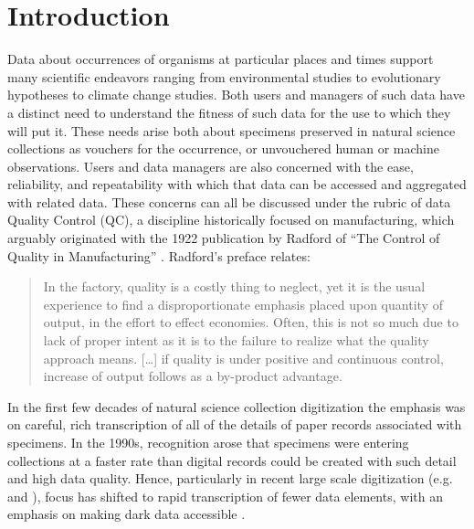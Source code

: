 \documentclass{article}
\begin{document}
\section{Introduction}
Data about occurrences of organisms at particular places and times support many scientific endeavors ranging from environmental studies to evolutionary hypotheses to climate change studies. 
Both users and managers of such data have a distinct need to understand the fitness of such data for the use to which they will put it. 
These needs arise both about specimens preserved in natural science collections as vouchers for the occurrence, or unvouchered human or machine observations.
Users and data managers are also concerned with the ease, reliability, and repeatability with which that data can be accessed and aggregated with related data.  
These concerns can all be discussed under the rubric of data Quality Control (QC), a discipline historically focused on manufacturing,  which arguably originated with the 1922 publication by Radford of “The Control of Quality in Manufacturing” \citep{radford_control_1922}. Radford's preface relates:
\begin{quotation}
  In the factory, quality is a costly thing to neglect, yet it is the usual experience to find a disproportionate emphasis placed upon quantity of output, in the effort to effect economies. Often, this is not so much due to lack of proper intent as it is to the failure to realize what the quality approach means. […] if quality is under positive and continuous control, increase of output follows as a by-product advantage.
\end{quotation}
In the first few decades of natural science collection digitization the emphasis was on careful, rich transcription of all of the details of paper records associated with specimens.  In the 1990s, recognition arose that specimens were entering collections at a faster rate than digital records could be created with such detail and high data quality. Hence, particularly in recent large scale digitization (e.g. \citep{ADBC} and \citep{Haston2012}), focus has shifted to rapid transcription of fewer data elements, with an emphasis on making dark data accessible \citep{ZooKeys209,Smith2012}.
\end{document}
